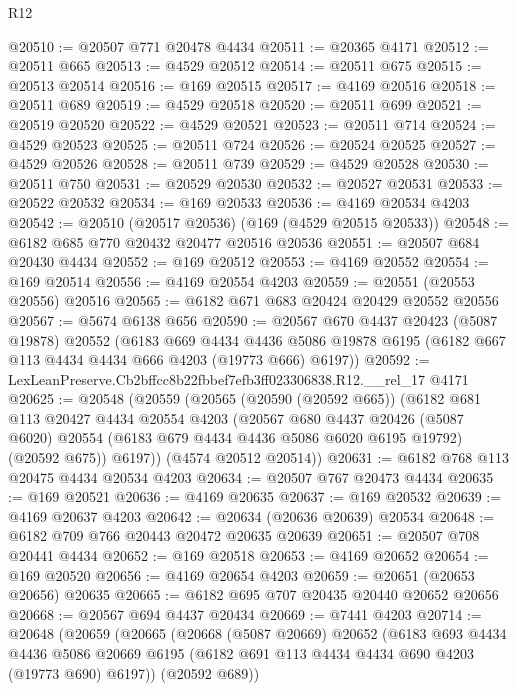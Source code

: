 \begin{lexlean}{R12}
\begin{coremodule}
@20510 := @20507 @771 @20478 @4434
@20511 := @20365 @4171
@20512 := @20511 @665
@20513 := @4529 @20512
@20514 := @20511 @675
@20515 := @20513 @20514
@20516 := @169 @20515
@20517 := @4169 @20516
@20518 := @20511 @689
@20519 := @4529 @20518
@20520 := @20511 @699
@20521 := @20519 @20520
@20522 := @4529 @20521
@20523 := @20511 @714
@20524 := @4529 @20523
@20525 := @20511 @724
@20526 := @20524 @20525
@20527 := @4529 @20526
@20528 := @20511 @739
@20529 := @4529 @20528
@20530 := @20511 @750
@20531 := @20529 @20530
@20532 := @20527 @20531
@20533 := @20522 @20532
@20534 := @169 @20533
@20536 := @4169 @20534 @4203
@20542 := @20510 (@20517 @20536) (@169 (@4529 @20515 @20533))
@20548 := @6182 @685 @770 @20432 @20477 @20516 @20536
@20551 := @20507 @684 @20430 @4434
@20552 := @169 @20512
@20553 := @4169 @20552
@20554 := @169 @20514
@20556 := @4169 @20554 @4203
@20559 := @20551 (@20553 @20556) @20516
@20565 := @6182 @671 @683 @20424 @20429 @20552 @20556
@20567 := @5674 @6138 @656
@20590 := @20567
    @670
    @4437
    @20423
    (@5087 @19878)
    @20552
    (@6183
      @669
      @4434
      @4436
      @5086
      @19878
      @6195
      (@6182 @667 @113 @4434 @4434 @666 @4203 (@19773 @666) @6197))
@20592 := LexLeanPreserve.Cb2bffcc8b22fbbef7efb3ff023306838.R12.__rel_17 @4171
@20625 := @20548
    (@20559
      (@20565
        (@20590 (@20592 @665))
        (@6182
          @681
          @113
          @20427
          @4434
          @20554
          @4203
          (@20567
            @680
            @4437
            @20426
            (@5087 @6020)
            @20554
            (@6183 @679 @4434 @4436 @5086 @6020 @6195 @19792)
            (@20592 @675))
          @6197))
      (@4574 @20512 @20514))
@20631 := @6182 @768 @113 @20475 @4434 @20534 @4203
@20634 := @20507 @767 @20473 @4434
@20635 := @169 @20521
@20636 := @4169 @20635
@20637 := @169 @20532
@20639 := @4169 @20637 @4203
@20642 := @20634 (@20636 @20639) @20534
@20648 := @6182 @709 @766 @20443 @20472 @20635 @20639
@20651 := @20507 @708 @20441 @4434
@20652 := @169 @20518
@20653 := @4169 @20652
@20654 := @169 @20520
@20656 := @4169 @20654 @4203
@20659 := @20651 (@20653 @20656) @20635
@20665 := @6182 @695 @707 @20435 @20440 @20652 @20656
@20668 := @20567 @694 @4437 @20434
@20669 := @7441 @4203
@20714 := @20648
    (@20659
      (@20665
        (@20668
          (@5087 @20669)
          @20652
          (@6183
            @693
            @4434
            @4436
            @5086
            @20669
            @6195
            (@6182 @691 @113 @4434 @4434 @690 @4203 (@19773 @690) @6197))
          (@20592 @689))

\end{coremodule}
\end{lexlean}
